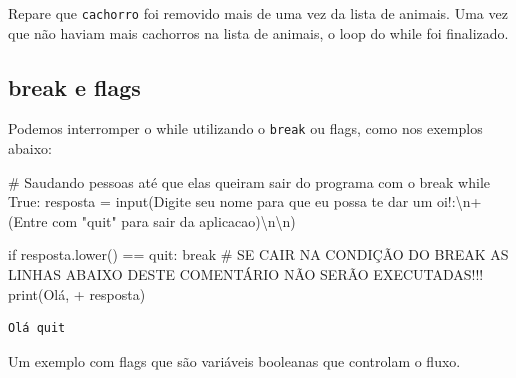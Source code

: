 \documentclass[
  letterpaper,
  DIV=11,
  numbers=noendperiod]{scrreprt}
\newenvironment{Shaded}{\begin{snugshade}}{\end{snugshade}}
\newcommand{\BuiltInTok}[1]{\textcolor[rgb]{0.00,0.23,0.31}{#1}}
\newcommand{\CharTok}[1]{\textcolor[rgb]{0.13,0.47,0.30}{#1}}
\newcommand{\CommentTok}[1]{\textcolor[rgb]{0.37,0.37,0.37}{#1}}
\newcommand{\ControlFlowTok}[1]{\textcolor[rgb]{0.00,0.23,0.31}{#1}}
\newcommand{\NormalTok}[1]{\textcolor[rgb]{0.00,0.23,0.31}{#1}}
\newcommand{\OperatorTok}[1]{\textcolor[rgb]{0.37,0.37,0.37}{#1}}
\newcommand{\StringTok}[1]{\textcolor[rgb]{0.13,0.47,0.30}{#1}}
\newcommand{\VariableTok}[1]{\textcolor[rgb]{0.07,0.07,0.07}{#1}}
\begin{document}
Repare que \texttt{\textquotesingle{}cachorro\textquotesingle{}} foi
removido mais de uma vez da lista de animais. Uma vez que não haviam
mais cachorros na lista de animais, o loop do while foi finalizado.

\hypertarget{break-e-flags}{%
\subsection{break e flags}\label{break-e-flags}}

Podemos interromper o while utilizando o \texttt{break} ou flags, como
nos exemplos abaixo:

\begin{Shaded}
\begin{Highlighting}[]
\CommentTok{\# Saudando pessoas até que elas queiram sair do programa com o break}
\ControlFlowTok{while} \VariableTok{True}\NormalTok{:}
\NormalTok{    resposta }\OperatorTok{=} \BuiltInTok{input}\NormalTok{(}\StringTok{\textquotesingle{}Digite seu nome para que eu possa te dar um oi!:}\CharTok{\textbackslash{}n}\StringTok{\textquotesingle{}}\OperatorTok{+}\StringTok{\textquotesingle{}(Entre com "quit" para sair da aplicacao)}\CharTok{\textbackslash{}n\textbackslash{}n}\StringTok{\textquotesingle{}}\NormalTok{)}
    
    \ControlFlowTok{if}\NormalTok{ resposta.lower() }\OperatorTok{==} \StringTok{\textquotesingle{}quit\textquotesingle{}}\NormalTok{:}
        \ControlFlowTok{break}
    \CommentTok{\# SE CAIR NA CONDIÇÃO DO \textasciigrave{}BREAK\textasciigrave{} AS LINHAS ABAIXO DESTE COMENTÁRIO NÃO SERÃO EXECUTADAS!!!}
\BuiltInTok{print}\NormalTok{(}\StringTok{\textquotesingle{}Olá, \textquotesingle{}} \OperatorTok{+}\NormalTok{ resposta)}
\end{Highlighting}
\end{Shaded}

\begin{tcolorbox}[enhanced jigsaw, breakable, leftrule=.75mm, left=2mm, opacityback=0, bottomrule=.15mm, toprule=.15mm, rightrule=.15mm, arc=.35mm, colback=white]

\begin{verbatim}
Olá quit
\end{verbatim}

\end{tcolorbox}

Um exemplo com flags que são variáveis booleanas que controlam o fluxo.
\end{document}
